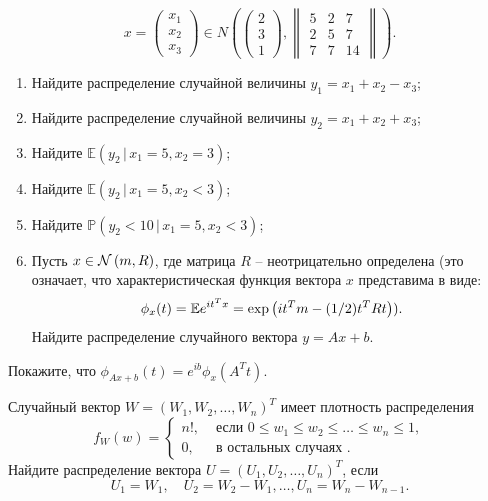 \begin{problem}
$$
x=\begin{pmatrix}
x_1\\
x_2\\
x_3
\end{pmatrix}
\in N\left(
\begin{pmatrix}
2\\
3\\
1
\end{pmatrix}, 
\begin{Vmatrix}
5 & 2 & 7\\
2 & 5 & 7\\
7 & 7 & 14
\end{Vmatrix}
\right) . 
$$
\begin{enumerate}
\item Найдите распределение случайной величины $y_1=x_1+x_2-x_3$; 
\item Найдите распределение случайной величины $y_2=x_1+x_2+x_3$; 
\item Найдите ${\mathbb E}(y_2\, |\, x_1=5, x_2=3)$; 
\item Найдите ${\mathbb E}(y_2\, |\, x_1=5, x_2<3)$; 
\item Найдите ${\mathbb P}(y_2<10\, |\, x_1=5, x_2<3)$;

\item Пусть $x\in \mathcal{N}\left(m, R\right)$, где матрица $R$ -- неотрицательно определена (это означает, что характеристическая функция вектора $x$ представима в виде: \[
\phi_{x}(t) = \mathrm{{\mathbb E}} e^{it^Tx} = \exp\left( it^{T}m-(1/2)t^{T}Rt \right)).
\]Найдите распределение случайного вектора $y = Ax + b$. 

\end{enumerate}
\end{problem}

\begin{ordre}
Покажите, что
$\phi_{Ax+b}(t) = e^{ib}\phi_{x}(A^{T}t)$.
\end{ordre}



\begin{problem}
\label{sec:ordered_seq}
Случайный вектор $W=(W_1, W_2, \ldots, W_n)^T$ имеет плотность распределения 
$$
f_W(w)=\begin{cases}
n! , & \text{ если } 0\leqslant w_1\leqslant w_2\leqslant \ldots \leqslant w_n\leqslant 1, \\
0, & \text{ в остальных случаях }. 
\end{cases}
$$
Найдите распределение вектора $U=(U_1, U_2, \ldots, U_n)^T$, если 
$$
U_1=W_1, \quad U_2=W_2-W_1, \ldots, U_n=W_n-W_{n-1} . 
$$
\end{problem}

